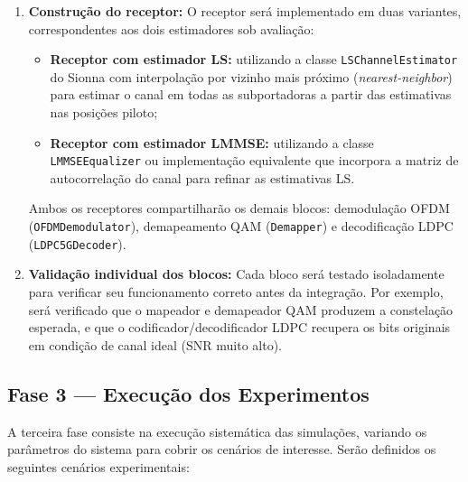\documentclass[conference]{IEEEtran}
\begin{document}
\begin{enumerate}
    \item \textbf{Construção do receptor:} O receptor será implementado em duas variantes, correspondentes aos dois estimadores sob avaliação:
    \begin{itemize}
        \item \textbf{Receptor com estimador LS:} utilizando a classe \texttt{LSChannelEstimator} do Sionna com interpolação por vizinho mais próximo (\textit{nearest-neighbor}) para estimar o canal em todas as subportadoras a partir das estimativas nas posições piloto;
        \item \textbf{Receptor com estimador LMMSE:} utilizando a classe \texttt{LMMSEEqualizer} ou implementação equivalente que incorpora a matriz de autocorrelação do canal para refinar as estimativas LS.
    \end{itemize}
    Ambos os receptores compartilharão os demais blocos: demodulação OFDM (\texttt{OFDMDemodulator}), demapeamento QAM (\texttt{Demapper}) e decodificação LDPC (\texttt{LDPC5GDecoder}).

    \item \textbf{Validação individual dos blocos:} Cada bloco será testado isoladamente para verificar seu funcionamento correto antes da integração. Por exemplo, será verificado que o mapeador e demapeador QAM produzem a constelação esperada, e que o codificador/decodificador LDPC recupera os bits originais em condição de canal ideal (SNR muito alto).
\end{enumerate}

\subsection{Fase 3 --- Execução dos Experimentos}

A terceira fase consiste na execução sistemática das simulações, variando os parâmetros do sistema para cobrir os cenários de interesse. Serão definidos os seguintes cenários experimentais:
\end{document}
